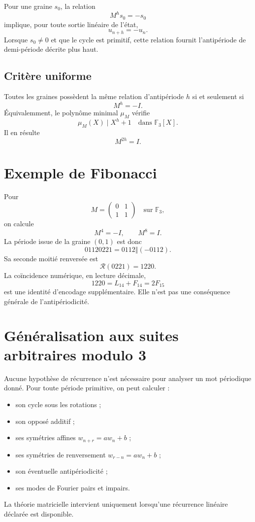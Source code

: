 \documentclass[11pt,a4paper]{article}
\newcommand{\F}{\mathbb F}
\newcommand{\concat}{\mathbin{\Vert}}
\begin{document}
Pour une graine \(s_0\), la relation
\[
M^hs_0=-s_0
\]
implique, pour toute sortie linéaire de l'état,
\[
u_{n+h}=-u_n.
\]
Lorsque \(s_0\neq0\) et que le cycle est primitif, cette relation fournit
l'antipériode de demi-période décrite plus haut.

\subsection{Critère uniforme}

Toutes les graines possèdent la même relation d'antipériode \(h\) si et
seulement si
\[
M^h=-I.
\]
Équivalemment, le polynôme minimal \(\mu_M\) vérifie
\[
\mu_M(X)\mid X^h+1
\quad\text{dans }\F_3[X].
\]
Il en résulte
\[
M^{2h}=I.
\]

\section{Exemple de Fibonacci}

Pour
\[
M=
\begin{pmatrix}
0&1\\
1&1
\end{pmatrix}
\quad\text{sur }\F_3,
\]
on calcule
\[
M^4=-I,
\qquad
M^8=I.
\]
La période issue de la graine \((0,1)\) est donc
\[
01120221=0112\concat(-0112).
\]
Sa seconde moitié renversée est
\[
\mathcal R(0221)=1220.
\]
La coïncidence numérique, en lecture décimale,
\[
1220=L_{14}+F_{14}=2F_{15}
\]
est une identité d'encodage supplémentaire. Elle n'est pas une conséquence
générale de l'antipériodicité.

\section{Généralisation aux suites arbitraires modulo 3}

Aucune hypothèse de récurrence n'est nécessaire pour analyser un mot
périodique donné. Pour toute période primitive, on peut calculer :
\begin{itemize}
\item son cycle sous les rotations ;
\item son opposé additif ;
\item ses symétries affines \(w_{n+r}=aw_n+b\) ;
\item ses symétries de renversement \(w_{r-n}=aw_n+b\) ;
\item son éventuelle antipériodicité ;
\item ses modes de Fourier pairs et impairs.
\end{itemize}
La théorie matricielle intervient uniquement lorsqu'une récurrence linéaire
déclarée est disponible.
\end{document}
